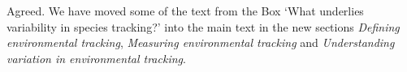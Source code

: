 \documentclass[11pt]{article}
\begin{document}
Agreed. We have moved some of the text from the Box `What underlies variability in species tracking?' into the main text in the new sections \emph{Defining environmental tracking}, \emph{Measuring environmental tracking} and \emph{Understanding variation in environmental tracking}.

\newpage


\end{document}
